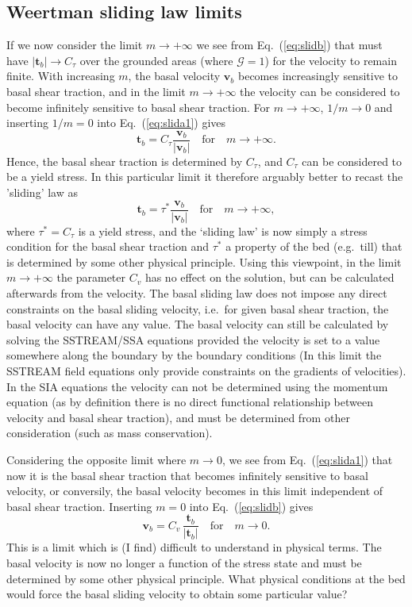 \documentclass[10pt,a4paper]{book}
\newcommand{\G}{\mathcal{G}}
\begin{document}
\subsection{Weertman sliding law limits}
If we now consider the limit $m \to +\infty$ we see from
Eq.~(\ref{eq:slidb}) that must have $|\bm{t}_b| \to C_{\tau}$ over the
grounded areas (where $\G=1$) for the velocity to remain finite.  With
increasing $m$, the basal velocity $\bm{v}_b$ becomes increasingly
sensitive to basal shear traction, and in the limit $m \to + \infty$
the velocity can be considered to become infinitely sensitive to basal
shear traction.  For $m \to +\infty$, $1/m \to 0$ and inserting
$1/m=0$ into Eq.~(\ref{eq:slida1}) gives
\[ 
     \bm{t}_b =  C_{\tau} \frac{\bm{v}_b}{| \bm{v}_b | }  \quad \text{for}   \quad m \to +\infty .
     \]
Hence, the basal shear traction is determined by $C_{\tau}$, and
$C_{\tau}$ can be considered to be a yield stress. In this particular
limit it therefore arguably better to recast the 'sliding' law as
\[
\bm{t}_b=  \tau^* \frac{\bm{v}_b}{| \bm{v}_b | }   \quad \text{for}   \quad m \to +\infty ,
\]
where $\tau^*=C_{\tau}$ is a yield stress, and the `sliding law' is
now simply a stress condition for the basal shear traction and
$\tau^*$ a property of the bed (e.g.\ till) that is determined by some
other physical principle.  Using this viewpoint, in the limit $m\to
+\infty$ the parameter $C_v$ has no effect on the solution, but can be
calculated afterwards from the velocity. The basal sliding law does not
impose any direct constraints on the basal sliding velocity, i.e.\ for
given basal shear traction, the basal velocity can have any value.
The basal velocity can still be calculated by solving the SSTREAM/SSA
equations provided the velocity is set to a value somewhere along the
boundary by the boundary conditions (In this limit the SSTREAM field
equations only provide constraints on the gradients of velocities). In
the SIA equations the velocity can not be determined using the
momentum equation (as by definition there is no direct functional
relationship between velocity and basal shear traction), and must be
determined from other consideration (such as mass conservation).

Considering the opposite limit where $m \to 0$, we see from Eq.~(\ref{eq:slida1})
that now it is the basal shear traction that becomes infinitely
sensitive to basal velocity, or conversily, the basal velocity becomes
in this limit independent of basal shear traction. Inserting $m=0$ into Eq.~(\ref{eq:slidb}) gives
\[
  \bm{v}_b    =  C_v  \, \frac{\bm{t}_b}{| \bm{t}_b|}   \quad \text{for}   \quad m \to 0.
\]  
This is a limit
which is (I find) difficult to understand in physical terms. The basal
velocity is now no longer a function of the stress state and must be
determined by some other physical principle. What physical conditions
at the bed would force the basal sliding velocity to obtain some
particular value?
\end{document}
